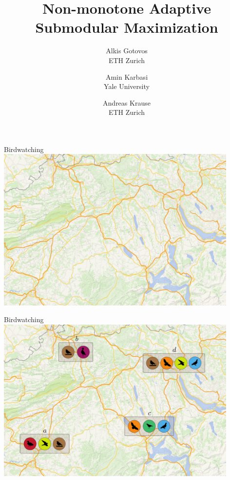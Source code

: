 \documentclass[xetex,10pt,mathserif]{beamer}
\title[Non-monotone Adaptive Submodular Maximization]
{Non-monotone Adaptive Submodular Maximization}
\author[Alkis Gotovos]{
\vspace{1in}
\normalsize
\parbox{1in}{Alkis Gotovos\\{\footnotesize ETH Zurich}}\and
\parbox{1in}{Amin Karbasi\\{\footnotesize Yale University}}\and
\parbox{1in}{Andreas Krause\\{\footnotesize ETH Zurich}}
}
\date[May 4, 2015]{
\begin{center}
{\normalsize
ICML '15
}
\end{center}
}
\begin{document}


\begin{frame}{Birdwatching}
\centering
\includegraphics[width=4.75in]{figures/map.pdf}
\end{frame}

\begin{frame}{Birdwatching}
\centering
\includegraphics[width=4.75in]{figures/intro_2.pdf}
\end{frame}
\end{document}
